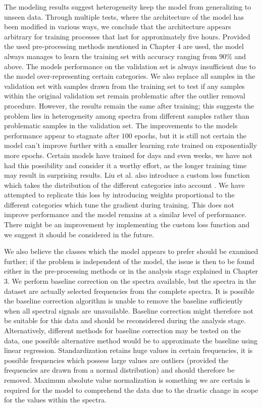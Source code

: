 The modeling results suggest heterogeneity keep the model from generalizing to unseen data. Through multiple tests, where the architecture of the model has been modified in various ways, we conclude that the architecture appears arbitrary for training processes that last for approximately five hours. Provided the used pre-processing methods mentioned in Chapter 4 are used, the model always manages to learn the training set with accuracy ranging from $90\%$ and above. The models performance on the validation set is always insufficient due to the model over-representing certain categories. We also replace all samples in the validation set with samples drawn from the training set to test if any samples within the original validation set remain problematic after the outlier removal procedure. However, the results remain the same after training; this suggests the problem lies in heterogeneity among spectra from different samples rather than problematic samples in the validation set. The improvements to the models performance appear to stagnate after $100$ epochs, but it is still not certain the model can't improve further with a smaller learning rate trained on exponentially more epochs. Certain models have trained for days and even weeks, we have not had this possibility and consider it a worthy effort, as the longer training time may result in surprising results. Liu et al. also introduce a custom loss function which takes the distribution of the different categories into account \cite{liu2017deep}. We have attempted to replicate this loss by introducing weights proportional to the different categories which tune the gradient during training. This does not improve performance and the model remains at a similar level of performance. There might be an improvement by implementing the custom loss function and we suggest it should be considered in the future.

We also believe the classes which the model appears to prefer should be examined further; if the problem is independent of the model, the issue is then to be found either in the pre-processing methods or in the analysis stage explained in Chapter 3. We perform baseline correction on the spectra available, but the spectra in the dataset are actually selected frequencies from the complete spectra. It is possible the baseline correction algorithm is unable to remove the baseline sufficiently when all spectral signals are unavailable. Baseline correction might therefore not be suitable for this data and should be reconsidered during the analysis stage. Alternatively, different methods for baseline correction may be tested on the data, one possible alternative method would be to approximate the baseline using linear regression. Standardization retains huge values in certain frequencies, it is possible frequencies which possess large values are outliers (provided the frequencies are drawn from a normal distribution) and should therefore be removed. Maximum absolute value normalization is something we are certain is required for the model to comprehend the data due to the drastic change in scope for the values within the spectra.

